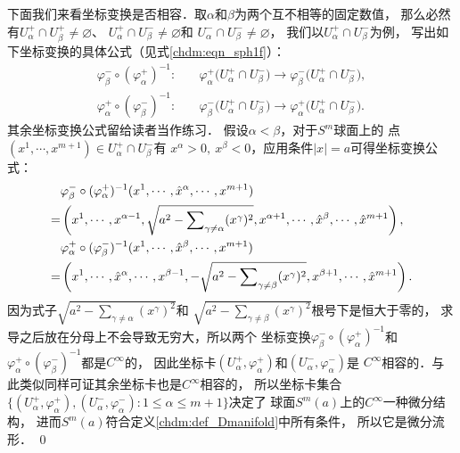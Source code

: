 下面我们来看坐标变换是否相容．取$\alpha$和$\beta$为两个互不相等的固定数值，
那么必然有$U_\alpha ^{+} \cap U_\beta ^{+} \neq \varnothing$、
$U_\alpha ^{+} \cap U_\beta ^{-} \neq \varnothing$和
$U_\alpha ^{-} \cap U_\beta ^{-} \neq \varnothing$，
我们以$U_\alpha ^{+} \cap U_\beta ^{-}$为例，
写出如下坐标变换的具体公式（见式\eqref{chdm:eqn_sph1f}）：
\begin{align*}
    \varphi^-_\beta \circ (\varphi^+_\alpha)^{-1}:& \quad \varphi^+_\alpha
      \bigl( U_\alpha ^{+} \cap U_\beta ^{-} \bigr) \to 
      \varphi^-_\beta \bigl( U_\alpha ^{+} \cap U_\beta ^{-} \bigr),  \\
    \varphi^+_\alpha \circ (\varphi^-_\beta)^{-1}:& \quad \varphi^-_\beta
      \bigl( U_\alpha ^{+} \cap U_\beta ^{-} \bigr) \to 
      \varphi^+_\alpha \bigl( U_\alpha ^{+} \cap U_\beta ^{-} \bigr) .
\end{align*}
其余坐标变换公式留给读者当作练习．
假设$\alpha < \beta$，对于$S^m$球面上的
点$(x^1,\cdots,x^{m+1})\in U_\alpha ^{+} \cap U_\beta ^{-}$有
$x^\alpha >0, \ x^\beta <0$，应用条件$|x|=a$可得坐标变换公式：
\begin{subequations}\label{chdm:eqn_sph1f}
\begin{align}
     &\varphi^-_\beta \circ (\varphi^+_\alpha)^{-1} (x^1,\cdots,\hat{x}^\alpha,\cdots,x^{m+1}) \notag \\
    =&\left(x^1,\cdots,x^{\alpha-1},\sqrt{a^2-\sum\nolimits_{ \gamma\neq \alpha}(x^\gamma)^2},
      x^{\alpha+1},\cdots,\hat{x}^\beta,\cdots,\hat{x}^{m+1}\right), \\
     &\varphi^+_\alpha \circ (\varphi^-_\beta)^{-1} (x^1,\cdots,\hat{x}^\beta,\cdots,x^{m+1}) \notag \\
    =&\left(x^1,\cdots,\hat{x}^\alpha,\cdots, x^{\beta-1},-\sqrt{a^2-\sum\nolimits_{\gamma\neq \beta}(x^\gamma)^2},
      x^{\beta+1},\cdots,\hat{x}^{m+1}\right) .
\end{align}
\end{subequations}
因为式子$\sqrt{a^2-\sum\nolimits_{ \gamma\neq \alpha}(x^\gamma)^2}$和
$\sqrt{a^2-\sum\nolimits_{\gamma\neq \beta}(x^\gamma)^2}$根号下是恒大于零的，
求导之后放在分母上不会导致无穷大，所以两个
坐标变换$\varphi^-_\beta \circ (\varphi^+_\alpha)^{-1}$和
$\varphi^+_\alpha \circ (\varphi^-_\beta)^{-1}$都是$C^\infty$的，
因此坐标卡$(U_\alpha ^{+}, \varphi_\alpha ^{+})$和$(U_\alpha ^{-}, \varphi_\alpha ^{-})$是
$C^\infty$相容的．与此类似同样可证其余坐标卡也是$C^\infty$相容的，
所以坐标卡集合$\{(U_\alpha ^{+}, \varphi_\alpha ^{+}),
(U_\alpha ^{-}, \varphi_\alpha ^{-}): 1\leqslant \alpha \leqslant m+1\}$决定了
球面$S^m(a)$上的$C^\infty$一种微分结构，
进而$S^m(a)$符合定义\ref{chdm:def_Dmanifold}中所有条件，
所以它是微分流形．
\qed



